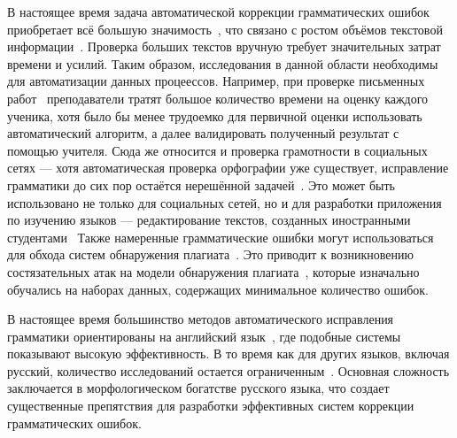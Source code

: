 В настоящее время задача автоматической коррекции грамматических ошибок приобретает всё большую значимость~\cite{b1, b2, b3}, что связано с ростом объёмов текстовой информации~\cite{b4}. Проверка больших текстов вручную требует значительных затрат времени и усилий. Таким образом, исследования в данной области необходимы для автоматизации данных процеессов. Например, при проверке письменных работ~\cite{b5} преподаватели тратят большое количество времени на оценку каждого ученика, хотя было бы менее трудоемко для первичной оценки использовать автоматический алгоритм, а далее валидировать полученный результат с помощью учителя. Сюда же относится и проверка грамотности в социальных сетях --- хотя автоматическая проверка орфографии уже существует, исправление грамматики до сих пор остаётся нерешённой задачей~\cite{b6}. Это может быть использовано не только для социальных сетей, но и для разработки приложения по изучению языков --- редактирование текстов, созданных иностранными студентами~\cite{b7} Также намеренные грамматические ошибки могут использоваться для обхода систем обнаружения плагиата~\cite{b8, b9}. Это приводит к возникновению состязательных атак на модели обнаружения плагиата~\cite{b10}, которые изначально обучались на наборах данных, содержащих минимальное количество ошибок. 

В настоящее время большинство методов автоматического исправления грамматики ориентированы на английский язык~\cite{b11}, где подобные системы показывают высокую эффективность. В то время как для других языков, включая русский, количество исследований остается ограниченным~\cite{b12}. Основная сложность заключается в морфологическом богатстве русского языка, что создает существенные препятствия для разработки эффективных систем коррекции грамматических ошибок.


